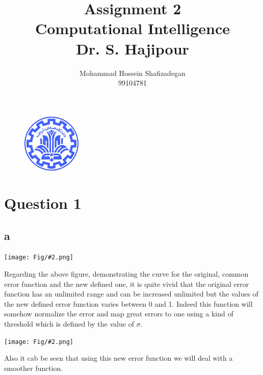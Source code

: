 \documentclass[]{article}
\author{
	Mohammad Hossein Shafizadegan\\
	99104781
}
\title{
	Assignment 2 \\
	Computational Intelligence  \\
	Dr. S. Hajipour
}
\newcommand{\pict}[2]{\begin{center}
		\texttt{[image: Fig/\#2.png]}
\end{center}}
\begin{document}
	\begin{figure}
		\includegraphics[width=0.25\textwidth]{Fig/Sharif.png}
		\centering
	\end{figure}
	\maketitle
	\tableofcontents
	\newpage
	\section{Question 1}
	\subsection*{a}
	\pict{0.6}{F1}
	Regarding the above figure, demonstrating the curve for the original, common error function and the new defined one, it is quite vivid that the original error function has an unlimited range and can be increased unlimited but the values of the new defined error function varies between 0 and 1. Indeed this function will somehow normalize the error and map great errors to one using a kind of threshold which is defined by the value of $\sigma$. 
	\pict{0.6}{F2}
	Also it cab be seen that using this new error function we will deal with a smoother function.
\end{document}
